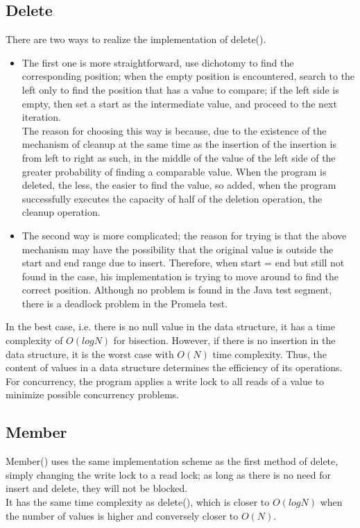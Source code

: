 \subsection{Delete}
\label{sec:Delete}
There are two ways to realize the implementation of delete().
\begin{itemize}
    \item The first one is more straightforward, use dichotomy to find the corresponding position; when the empty position is encountered, search to the left only to find the position that has a value to compare; if the left side is empty, then set a start as the intermediate value, and proceed to the next iteration. \vspace{8pt}\\
    The reason for choosing this way is because, due to the existence of the mechanism of cleanup at the same time as the insertion of the insertion is from left to right as such, in the middle of the value of the left side of the greater probability of finding a comparable value. When the program is deleted, the less, the easier to find the value, so added, when the program successfully executes the capacity of half of the deletion operation, the cleanup operation.
    \item The second way is more complicated; the reason for trying is that the above mechanism may have the possibility that the original value is outside the start and end range due to insert. Therefore, when start = end but still not found in the case, his implementation is trying to move around to find the correct position. Although no problem is found in the Java test segment, there is a deadlock problem in the Promela test.
\end{itemize}
In the best case, i.e. there is no null value in the data structure, it has a time complexity of $O(logN)$ for bisection. However, if there is no insertion in the data structure, it is the worst case with $O(N)$ time complexity. Thus, the content of values in a data structure determines the efficiency of its operations. \vspace{8pt}\\
For concurrency, the program applies a write lock to all reads of a value to minimize possible concurrency problems.

\subsection{Member}
\label{sec:member}
Member() uses the same implementation scheme as the first method of delete, simply changing the write lock to a read lock; as long as there is no need for insert and delete, they will not be blocked.\vspace{8pt}\\
It has the same time complexity as delete(), which is closer to $O(logN)$ when the number of values is higher and conversely closer to $O(N)$.

